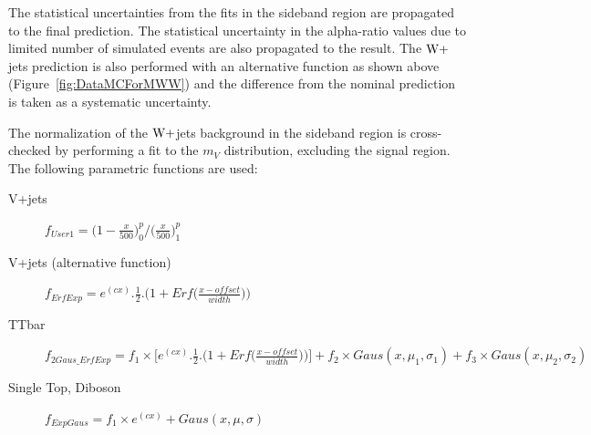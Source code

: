 
The statistical uncertainties from the fits in the sideband region are propagated to the final prediction. The statistical uncertainty in the alpha-ratio values due to limited number of simulated events are also propagated to the result. The $\mathrm{W}+$jets prediction is also performed with an alternative function as shown above (Figure~\ref{fig:DataMCForMWW}) and the difference from the nominal prediction is taken as a systematic uncertainty.    

The normalization of the $\mathrm{W}+$jets background in the sideband region is cross-checked by performing a fit to the $m_{V}$ distribution, excluding the signal region. The following parametric functions are used: 

\begin{description}
	\item [V+jets] $f_{User1} = \Big(1-\frac{x}{500}\Big)^p_0/\Big(\frac{x}{500}\Big)^p_1$ 
	\item [V+jets (alternative function)] $f_{ErfExp} = e^{(cx)}. \frac{1}{2}.\Big(1+Erf\big(\frac{x-offset}{width}\big)\Big)$
	\item [TTbar] $f_{2Gaus\_ErfExp} = f_1 \times \Big[e^{(cx)}. \frac{1}{2}.\Big(1+Erf\big(\frac{x-offset}{width}\big)\Big)\Big] + f_2 \times Gaus(x,\mu_1,\sigma_1) + f_3\times Gaus(x,\mu_2,\sigma_2) $
	\item [Single Top, Diboson] $f_{ExpGaus} = f_1 \times e^{(cx)} + Gaus(x,\mu,\sigma) $
\end{description}

